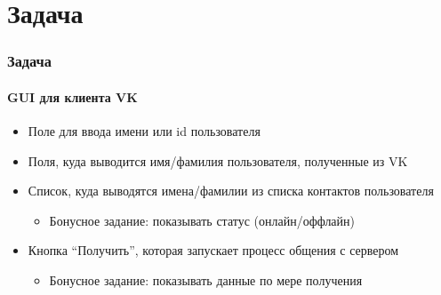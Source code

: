 \documentclass[xetex,mathserif,serif]{beamer}
\begin{document}
	\section{Задача}

	\begin{frame}
		\frametitle{Задача}
		\framesubtitle{GUI для клиента VK}
		\begin{itemize}
			\item Поле для ввода имени или id пользователя
			\item Поля, куда выводится имя/фамилия пользователя, полученные из VK
			\item Список, куда выводятся имена/фамилии из списка контактов пользователя
			\begin{itemize}
				\item Бонусное задание: показывать статус (онлайн/оффлайн)
			\end{itemize}
			\item Кнопка ``Получить'', которая запускает процесс общения с сервером
			\begin{itemize}
				\item Бонусное задание: показывать данные по мере получения
			\end{itemize}
		\end{itemize}
	\end{frame}
\end{document}
